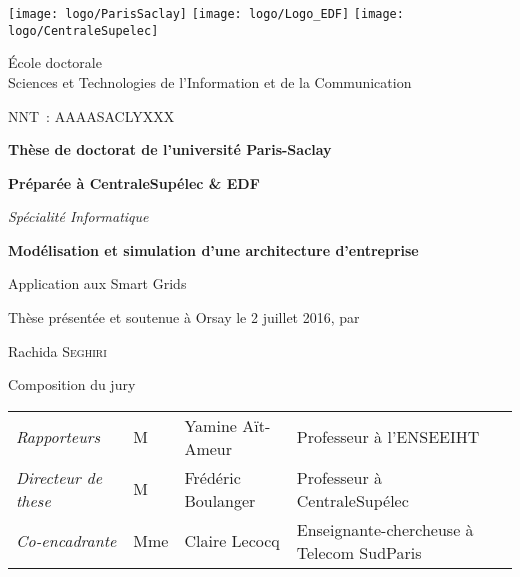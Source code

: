 \begin{titlepage}
\vspace*{-2cm}
\texttt{[image: logo/ParisSaclay]}\hfill
\texttt{[image: logo/Logo\_EDF]}\hfill
\texttt{[image: logo/CentraleSupelec]}

\hrulefill

\begin{minipage}[t]{0.6\textwidth}
    {\small
        École doctorale \\
        Sciences et Technologies de l'Information et de la Communication\\
    }
\end{minipage}
\hfill
\begin{minipage}[t]{0.3\textwidth}
    NNT~: AAAASACLYXXX
\end{minipage}

\bigskip
\bigskip

\begin{center}
{\large\bfseries Thèse de doctorat de l'université Paris-Saclay}

{\large\bfseries Préparée à CentraleSupélec \& EDF}

{\large \textit{Spécialité Informatique}}

\vfill

{\LARGE\bfseries
    Modélisation et simulation d'une architecture d'entreprise
    
    Application aux Smart Grids
}

\vfill

{\large Thèse présentée et soutenue à Orsay le 2 juillet 2016, par}


\bigskip

{\Large Rachida \textsc{Seghiri}}

\end{center}
\vfill

{\large Composition du jury}

\noindent\begin{tabulary}{\textwidth}{@{}p{0.2\textwidth}p{2em}p{0.2\textwidth}p{0.46\textwidth}L}
\midrule
\textit{Rapporteurs}         & M   & Yamine Aït-Ameur   & Professeur à l'ENSEEIHT \\
\textit{Directeur de these}  & M   & Frédéric Boulanger & Professeur à CentraleSupélec \\
\textit{Co-encadrante}       & Mme & Claire Lecocq      & Enseignante-chercheuse à Telecom SudParis \\
\midrule
\end{tabulary}


\end{titlepage}
\restoregeometry
\thispagestyle{empty}
\cleardoublepage
